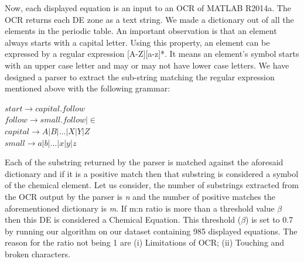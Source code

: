 \documentclass[conference]{IEEEtran}
\begin{document}
Now, each displayed equation is an input to an OCR of MATLAB R2014a.
The OCR returns each DE zone as a text string.
We made a dictionary out of all the elements in the periodic table. An important observation is that an element always starts with a capital letter. Using this property, an element can be expressed by a regular expression [A-Z][a-z]*. 
It means an element's symbol starts with an upper case letter and may or may not have lower case letters. 
We have designed a parser to extract the sub-string matching the regular expression  mentioned  above with the following grammar:
\begin{center}
$start \rightarrow capital.follow$\\
$follow \rightarrow small.follow | \in$\\
$capital \rightarrow A|B| \dots |X|Y|Z$\\
$small \rightarrow a|b| \dots |x|y|z$\\
\end{center}
Each of the substring returned by the parser is matched against the aforesaid dictionary and if it is a positive match then that substring is considered a symbol of the chemical element. 
Let us consider, the number of substrings extracted from the OCR output by the parser is {\em n}  and the number of positive matches 
the aforementioned dictionary is {\em m}.
If m:n ratio is more than a threshold value $\beta$ then this DE is considered  a Chemical Equation. 
This threshold ($\beta$) is set to 0.7 by running our algorithm on our dataset containing 985 displayed equations. The reason for the ratio not being 1 are (i)  Limitations of OCR; (ii) Touching and broken characters.
\end{document}
